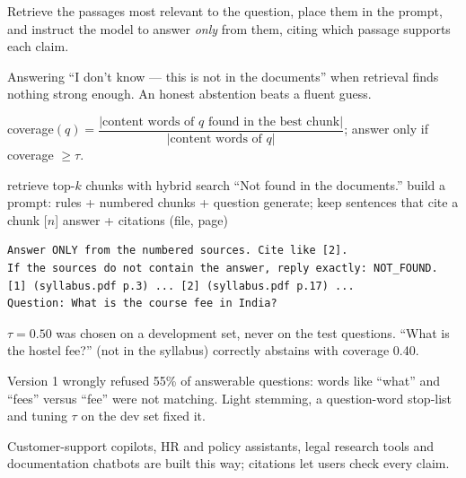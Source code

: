 \documentclass[11pt,a4paper]{article}
\begin{document}
\begin{bdef}[RAG]
Retrieve the passages most relevant to the question, place them in the prompt, and instruct the model to answer \emph{only} from them, citing which passage supports each claim.
\end{bdef}
\begin{bdef}[Abstention]
Answering ``I don't know --- this is not in the documents'' when retrieval finds nothing strong enough. An honest abstention beats a fluent guess.
\end{bdef}
\begin{bmath}
coverage$(q)=\dfrac{|\text{content words of }q\text{ found in the best chunk}|}{|\text{content words of }q|}$; \;answer only if coverage $\ge\tau$.
\end{bmath}
\begin{balgo}
\begin{algorithmic}[1]
\State retrieve top-$k$ chunks with hybrid search
 \State \Return ``Not found in the documents.'' \EndIf
\State build a prompt: rules + numbered chunks + question
\State generate; keep sentences that cite a chunk [$n$]
\State \Return answer + citations (file, page)
\end{algorithmic}
\end{balgo}
\begin{bcode}
\begin{lstlisting}
Answer ONLY from the numbered sources. Cite like [2].
If the sources do not contain the answer, reply exactly: NOT_FOUND.
[1] (syllabus.pdf p.3) ... [2] (syllabus.pdf p.17) ...
Question: What is the course fee in India?
\end{lstlisting}
\end{bcode}
\begin{bres}
$\tau=0.50$ was chosen on a development set, never on the test questions. ``What is the hostel fee?'' (not in the syllabus) correctly abstains with coverage 0.40.
\end{bres}
\begin{bwarn}
Version 1 wrongly refused 55\% of answerable questions: words like ``what'' and ``fees'' versus ``fee'' were not matching. Light stemming, a question-word stop-list and tuning $\tau$ on the dev set fixed it.
\end{bwarn}
\begin{bapp}
Customer-support copilots, HR and policy assistants, legal research tools and documentation chatbots are built this way; citations let users check every claim.
\end{bapp}
\end{document}
